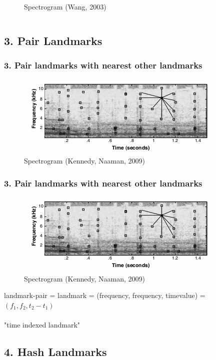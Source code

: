 \documentclass{beamer}
\begin{document}
\begin{frame}
\begin{columns}
\begin{figure}
\caption{Spectrogram (Wang, 2003)}
\end{figure}
\end{columns}
\end{frame}




\subsection{3. Pair Landmarks}
\begin{frame}
\frametitle{3. Pair landmarks with nearest other landmarks}
\begin{figure}
\includegraphics[scale=0.5]{pngs/07_spektrogramm.png} 
\caption{Spectrogram (Kennedy, Naaman, 2009)}
\end{figure}
\end{frame}


\begin{frame}
\frametitle{3. Pair landmarks with nearest other landmarks}
\begin{figure}
\includegraphics[scale=0.5]{pngs/07_spektrogramm.png} 
\caption{Spectrogram (Kennedy, Naaman, 2009)}
\end{figure}
\begin{center}
landmark-pair = landmark = (frequency, frequency, timevalue) = $(f_1, f_2, t_2-t_1)$\\
\ \\
"time indexed landmark"
\end{center}
\end{frame}






\subsection{4. Hash Landmarks}
\end{document}
